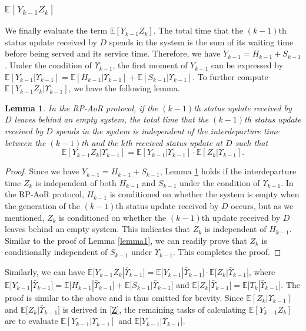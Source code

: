 \documentclass{IEEEtran}
\newtheorem{lemma}{Lemma}
\begin{document}
\subsubsection{$\mathbb{E}[Y_{k-1}Z_k]$}
We finally evaluate the term $\mathbb{E}[Y_{k-1}Z_k]$. The total time that the $(k-1)$th status update received by $D$ spends in the system is the sum of its waiting time before being served and its service time. Therefore, we have  $Y_{k-1}=H_{k-1}+S_{k-1}$. Under the condition of $\Upsilon_{k-1}$, the first moment of $Y_{k-1}$ can be expressed by $\mathbb{E}[Y_{k-1}|\Upsilon_{k-1}]=\mathbb{E}[H_{k-1}|\Upsilon_{k-1}]+\mathbb{E}[S_{k-1}|\Upsilon_{k-1}]$. To further compute $\mathbb{E}[Y_{k-1}Z_k|\Upsilon_{k-1}]$, we have the following lemma.
\begin{lemma}\label{lemma2}
	In the RP-AoR protocol, if the $(k-1)$th status update received by $D$ leaves behind an empty system, the total time that the $(k-1)$th status update received by $D$ spends in the system is independent of the interdeparture time between the $(k-1)$th and the $k$th received status update at $D$ such that
	\begin{equation} \label{lemma2equation}
	\mathbb{E}[Y_{k-1}Z_k|\Upsilon_{k-1}]=\mathbb{E}[Y_{k-1}|\Upsilon_{k-1}]\cdot \mathbb{E}[Z_k|\Upsilon_{k-1}].
	\end{equation}
\end{lemma}

\begin{proof}
	Since we have $Y_{k-1}=H_{k-1}+S_{k-1}$, Lemma \ref{lemma2} holds if the interdeparture time $Z_k$ is independent of both $H_{k-1}$ and $S_{k-1}$ under the condition of $\Upsilon_{k-1}$. In the RP-AoR protocol, $H_{k-1}$ is conditioned on whether the system is empty when the generation of the $(k-1)$th status update received by $D$ occurs, but as we mentioned, $Z_k$ is conditioned on whether the $(k-1)$th update received by $D$ leaves behind an empty system. This indicates that $Z_k$ is independent of $H_{k-1}$. Similar to the proof of Lemma \ref{lemma1}, we can readily prove that $Z_k$ is conditionally independent of $S_{k-1}$ under $\Upsilon_{k-1}$. This completes the proof.
\end{proof}
\noindent Similarly, we can have $\mathbb{E}\big[Y_{k-1}Z_k|\bar{\Upsilon}_{k-1}\big]=\mathbb{E}\big[Y_{k-1}|\bar{\Upsilon}_{k-1}\big]\cdot \mathbb{E}\big[Z_k|\bar{\Upsilon}_{k-1}\big]$, where $\mathbb{E}\big[Y_{k-1}|\bar{\Upsilon}_{k-1}\big]=\mathbb{E}\big[H_{k-1}|\bar{\Upsilon}_{k-1}\big]+\mathbb{E}\big[S_{k-1}|\bar{\Upsilon}_{k-1}\big]$ and $\mathbb{E}\big[Z_k|\bar{\Upsilon}_{k-1}\big]=\mathbb{E}\big[T_k|\bar{\Upsilon}_{k-1}\big]$. The proof is similar to the above and is thus omitted for brevity. Since $\mathbb{E}[Z_k|\Upsilon_{k-1}]$ and $\mathbb{E}\big[Z_k|\bar{\Upsilon}_{k-1}\big]$ is derived in \eqref{Z}, the remaining tasks of calculating $\mathbb{E}[Y_{k-1}Z_{k}]$ are to evaluate $\mathbb{E}[Y_{k-1}|\Upsilon_{k-1}]$ and $\mathbb{E}\big[Y_{k-1}|\bar{\Upsilon}_{k-1}\big]$.
\end{document}
